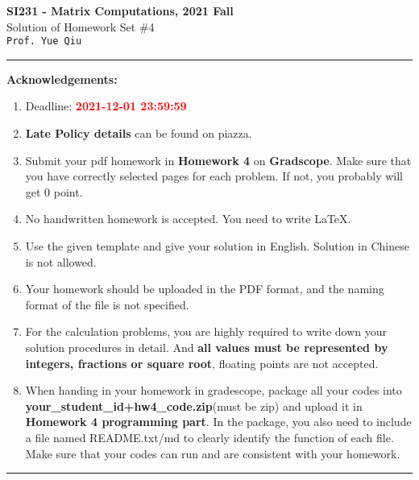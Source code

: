 \documentclass[english,onecolumn]{IEEEtran}
\begin{document}
\begin{center}
	\textbf{\LARGE{SI231 - Matrix Computations, 2021 Fall}}\\
	{\Large Solution of Homework Set \#4}\\
	\texttt{Prof. Yue Qiu}
\par\end{center}

\noindent
\rule{\linewidth}{0.4pt}
{\bf Acknowledgements:}
\begin{enumerate}
	\item Deadline: {\bf \textcolor{red}{2021-12-01 23:59:59}}
	\item \textbf{Late Policy details} can be found on piazza.
	\item Submit your pdf homework in \textbf{Homework 4} on \textbf{Gradscope}. Make sure that you have correctly selected pages for each problem. If not, you probably will get 0 point.
	\item No handwritten homework is accepted. You need to write \LaTeX. 
	\item Use the given template and give your solution in English. Solution in Chinese is not allowed.
	\item Your homework should be uploaded in the PDF format, and the naming format of the file is not specified.
	\item For the calculation problems, you are highly required to write down your solution procedures in detail. And \textbf{all values must be represented by integers, fractions or square root}, floating points are not accepted.
	\item When handing in your homework in gradescope, package all your codes into \textbf{your\_student\_id+hw4\_code.zip}(must be zip) and upload it in \textbf{Homework 4 programming part}. In the package,  you  also  need  to  include  a  file  named  README.txt/md  to  clearly  identify  the function of each file. Make sure that your codes can run and are consistent with your homework.
\end{enumerate}
\rule{\linewidth}{0.4pt}
\end{document}
